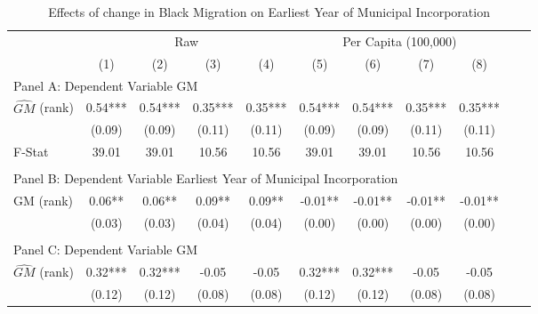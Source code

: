  \begin{table}[htbp]\centering {} \begin{threeparttable} \caption{Effects of change in Black Migration on Earliest Year of Municipal Incorporation} \begin{tabular}{l*{10}{c}} \toprule
                &\multicolumn{4}{c}{Raw}                                    &\multicolumn{4}{c}{Per Capita (100,000)}                   \\\cmidrule(lr){2-5}\cmidrule(lr){6-9}
                &\multicolumn{1}{c}{(1)}   &\multicolumn{1}{c}{(2)}   &\multicolumn{1}{c}{(3)}   &\multicolumn{1}{c}{(4)}   &\multicolumn{1}{c}{(5)}   &\multicolumn{1}{c}{(6)}   &\multicolumn{1}{c}{(7)}   &\multicolumn{1}{c}{(8)}   \\
\cmidrule(lr){1-9}
\multicolumn{8}{l}{Panel A: Dependent Variable GM}\\
\cmidrule(lr){1-9}
$\hat{GM}$ (rank)&       0.54***&       0.54***&       0.35***&       0.35***&       0.54***&       0.54***&       0.35***&       0.35***\\
                &     (0.09)   &     (0.09)   &     (0.11)   &     (0.11)   &     (0.09)   &     (0.09)   &     (0.11)   &     (0.11)   \\
\midrule
F-Stat          &      39.01   &      39.01   &      10.56   &      10.56   &      39.01   &      39.01   &      10.56   &      10.56   \\
\cmidrule[\heavyrulewidth](lr){1-9} \\ \cmidrule[\heavyrulewidth](lr){1-9}
\multicolumn{8}{l}{Panel B: Dependent Variable Earliest Year of Municipal Incorporation}\\
\cmidrule(lr){1-9}
GM  (rank)      &       0.06** &       0.06** &       0.09** &       0.09** &      -0.01** &      -0.01** &      -0.01** &      -0.01** \\
                &     (0.03)   &     (0.03)   &     (0.04)   &     (0.04)   &     (0.00)   &     (0.00)   &     (0.00)   &     (0.00)   \\
\cmidrule[\heavyrulewidth](lr){1-9} \\ \cmidrule[\heavyrulewidth](lr){1-9}
\multicolumn{8}{l}{Panel C: Dependent Variable GM}\\
\cmidrule(lr){1-9}
$\hat{GM}$ (rank)&       0.32***&       0.32***&      -0.05   &      -0.05   &       0.32***&       0.32***&      -0.05   &      -0.05   \\
                &     (0.12)   &     (0.12)   &     (0.08)   &     (0.08)   &     (0.12)   &     (0.12)   &     (0.08)   &     (0.08)   \\

\end{tabular}
\end{threeparttable}
\end{table}
